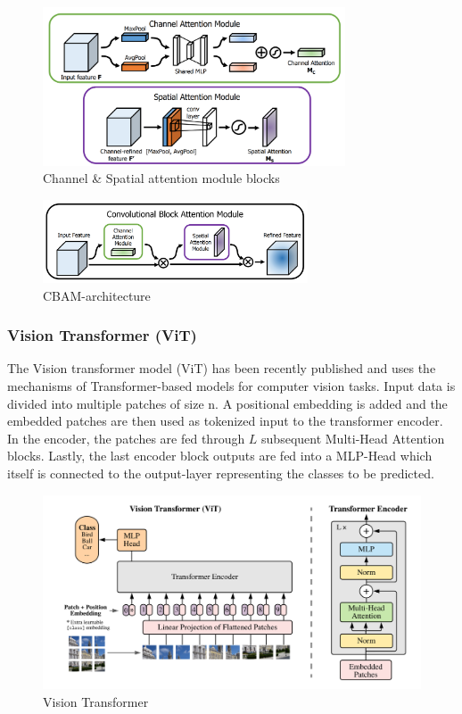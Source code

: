 \begin{figure}[H]
    \centering
    \includegraphics[width=0.8\textwidth]{Figures/cbam_modules.png}
    \caption{Channel \& Spatial attention module blocks \cite{woo_cbam_2018}}
    \label{fig:cbam_modules}
\end{figure}

\begin{figure}[H]
    \centering
    \includegraphics[width=0.7\textwidth]{Figures/cbam_modul.png}
    \caption{CBAM-architecture \cite{woo_cbam_2018}}
    \label{fig:cbam}
\end{figure}


\subsubsection{Vision Transformer (ViT)}
The Vision transformer model (ViT) has been recently published \cite{dosovitskiy_image_2021} and uses the mechanisms of Transformer-based models for computer vision tasks. Input data is divided into multiple patches of size n. A positional embedding is added and the embedded patches are then used as tokenized input to the transformer encoder. In the encoder, the patches are fed through $L$ subsequent Multi-Head Attention blocks. Lastly, the last encoder block outputs are fed into a MLP-Head which itself is connected to the output-layer representing the classes to be predicted.

\begin{figure}
    \centering
    \includegraphics[width=\textwidth]{Figures/ViT.png}
    \caption{Vision Transformer \cite{dosovitskiy_image_2021}}
    \label{fig:vit_model}
\end{figure}
